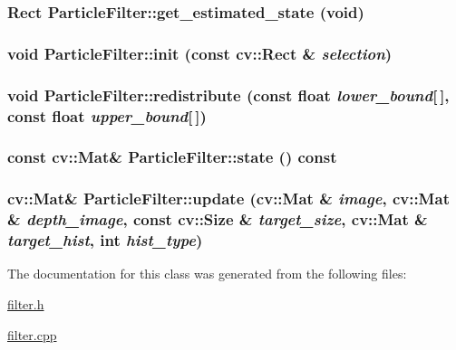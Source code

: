 \label{classParticleFilter_a7d3863cfb7922787bdfae897bf24a734}
\hypertarget{classParticleFilter_a74680a952aac5da591c2854ede6fbbd7}{
\subsubsection[{get\_\-estimated\_\-state}]{\setlength{\rightskip}{0pt plus 5cm}Rect ParticleFilter::get\_\-estimated\_\-state (void)}}
\label{classParticleFilter_a74680a952aac5da591c2854ede6fbbd7}
\hypertarget{classParticleFilter_a06b39d5e76cbb5de792d7c1021c02557}{
\subsubsection[{init}]{\setlength{\rightskip}{0pt plus 5cm}void ParticleFilter::init (const cv::Rect \& {\em selection})}}
\label{classParticleFilter_a06b39d5e76cbb5de792d7c1021c02557}
\hypertarget{classParticleFilter_a7054878a2bed0544f0915b4eecc2ffca}{
\subsubsection[{redistribute}]{\setlength{\rightskip}{0pt plus 5cm}void ParticleFilter::redistribute (const float {\em lower\_\-bound}\mbox{[}$\,$\mbox{]}, \/  const float {\em upper\_\-bound}\mbox{[}$\,$\mbox{]})}}
\label{classParticleFilter_a7054878a2bed0544f0915b4eecc2ffca}
\hypertarget{classParticleFilter_a4c909c7d4af1dd9ea2d06a568212e3dc}{
\subsubsection[{state}]{\setlength{\rightskip}{0pt plus 5cm}const cv::Mat\& ParticleFilter::state () const}}
\label{classParticleFilter_a4c909c7d4af1dd9ea2d06a568212e3dc}
\hypertarget{classParticleFilter_a8960c05cc9f6ec361dfcbb168eecb602}{
\subsubsection[{update}]{\setlength{\rightskip}{0pt plus 5cm}cv::Mat\& ParticleFilter::update (cv::Mat \& {\em image}, \/  cv::Mat \& {\em depth\_\-image}, \/  const cv::Size \& {\em target\_\-size}, \/  cv::Mat \& {\em target\_\-hist}, \/  int {\em hist\_\-type})}}
\label{classParticleFilter_a8960c05cc9f6ec361dfcbb168eecb602}


The documentation for this class was generated from the following files:\begin{DoxyCompactItemize}
\item 
\hyperlink{filter_8h}{filter.h}\item 
\hyperlink{filter_8cpp}{filter.cpp}\end{DoxyCompactItemize}
